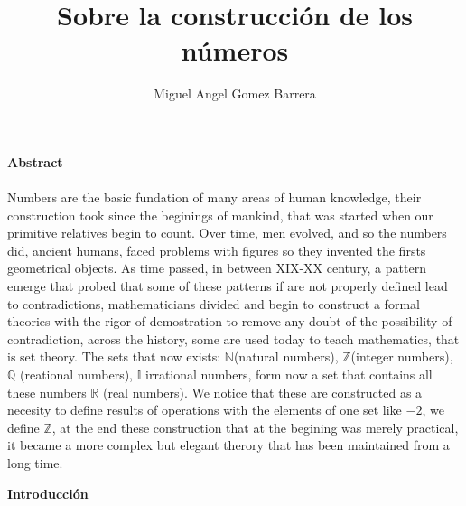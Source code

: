 \documentclass{article}
\title{Sobre la construcción de los números}
\author{Miguel Angel Gomez Barrera}
\begin{document}
\maketitle

\begin{center}\textbf{Abstract}\end{center}
\paragraph{} Numbers are the basic fundation of many areas of human knowledge, their construction took since the beginings of mankind, that was started when our primitive relatives begin to count. Over time, men evolved, and so the numbers did, ancient humans, faced problems with figures so they invented the firsts geometrical objects. As time passed, in between XIX-XX century, a pattern emerge that probed that some of these patterns if are not properly defined lead to contradictions, mathematicians divided and begin to construct a formal theories with the rigor of demostration to remove any doubt of the possibility of contradiction, across the history, some are used today to teach mathematics, that is set theory. The sets that now exists: $\mathbb{N}$(natural numbers), $\mathbb{Z}$(integer numbers), $\mathbb{Q}$ (reational numbers), $\mathbb{I}$ irrational numbers, form now a set that contains all these numbers $\mathbb{R}$ (real numbers). We notice that these are constructed as a necesity to define results of operations with the elements of one set like $-2$, we define $\mathbb{Z}$, at the end these construction that at the begining was merely practical, it became a more complex but elegant therory that has been maintained from a long time.


\begin{center}\textbf{Introducción}\end{center}
\end{document}
